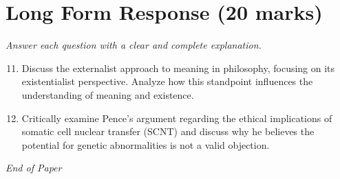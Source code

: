 \documentclass[12pt]{article}
\begin{document}
\section*{Long Form Response (20 marks)}
\textit{Answer each question with a clear and complete explanation.}
\begin{enumerate}[label=\arabic*.]
\setcounter{enumi}{10}
\item Discuss the externalist approach to meaning in philosophy, focusing on its existentialist perspective. Analyze how this standpoint influences the understanding of meaning and existence.
\item Critically examine Pence's argument regarding the ethical implications of somatic cell nuclear transfer (SCNT) and discuss why he believes the potential for genetic abnormalities is not a valid objection.
\end{enumerate}

\vfill
\noindent\textit{End of Paper}
\end{document}
